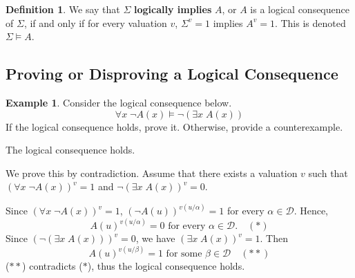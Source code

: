 \documentclass[11pt]{article}
\makeatletter
\theoremstyle{definition}
\newtheorem{defn}[thm]{Definition}
\newtheorem{exmp}[thm]{Example}
\newenvironment{pf}[1][\proofname]{\par
  \pushQED{\qed}%
  \normalfont \topsep0\p@\relax
  \trivlist
  \item[\hskip\labelsep\itshape
  #1\@addpunct{.}]\ignorespaces
}{%
  \popQED\endtrivlist\@endpefalse
}
\makeatother
\begin{document}
\begin{defn}
We say that $\Sigma$ {\bf logically implies} $A$, or $A$ is a logical consequence of $\Sigma$, if and only if for every valuation $v$, $\Sigma^v = 1$ implies $A^v = 1$. This is denoted $\Sigma \vDash A$.
\end{defn}

\subsection{Proving or Disproving a Logical Consequence}
\begin{exmp}
Consider the logical consequence below.
$$\forall x \; \neg A(x) \vDash \neg(\exists x \; A(x))$$
If the logical consequence holds, prove it. Otherwise, provide a counterexample.

The logical consequence holds.

\begin{pf}
We prove this by contradiction. Assume that there exists a valuation $v$ such that $(\forall x \; \neg A(x))^v = 1$ and $\neg (\exists x \; A(x))^v = 0$. 

Since $(\forall x \; \neg A(x))^v = 1$, $(\neg A(u))^{v(u/\alpha)} = 1$ for every $\alpha \in \mathcal{D}$. Hence, 
$$A(u)^{v(u/\alpha)} = 0 \text{ for every } \alpha \in \mathcal{D}. \quad (*)$$
Since $(\neg (\exists x \; A(x)))^v = 0$, we have $(\exists x \; A(x))^v = 1$. Then
$$A(u)^{v(u/\beta)} = 1 \text{ for some } \beta \in \mathcal{D} \quad (**)$$
($**$) contradicts ($*$), thus the logical consequence holds.
\end{pf}
\end{exmp}
\end{document}
